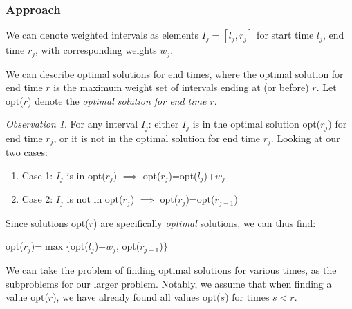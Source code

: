 \documentclass[12pt]{extarticle}
\theoremstyle{definition}
\theoremstyle{remark}
\newtheorem*{observation}{Observation}
\begin{document}
\subsubsection*{Approach}
We can denote weighted intervals as elements $I_j=[l_j,r_j]$ for start time $l_j$, end time $r_j$, with corresponding weights $w_j$.

\vspace{8pt}
\noindent We can describe optimal solutions for end times, where the optimal solution for end time $r$ is the maximum weight set of intervals ending at (or before) $r$. Let \ul{opt($r$)} denote the \textit{optimal solution for end time $r$}.

\begin{tcolorbox}[colback=white!95!black]
    \begin{observation}
    For any interval $I_j$: either $I_j$ is in the optimal solution opt($r_j$) for end time $r_j$, or it is not in the optimal solution for end time $r_j$. Looking at our two cases: \begin{enumerate}
        \item Case 1: $I_j$ is in opt($r_j$) $\implies$ opt($r_j$)=opt($l_j$)+$w_j$
        \item Case 2: $I_j$ is not in opt($r_j$) $\implies$ opt($r_j$)=opt($r_{j-1}$)
    \end{enumerate}
    Since solutions opt($r$) are specifically \textit{optimal} solutions, we can thus find:\begin{center}
        opt($r_j$)=$\max\{$opt($l_j$)+$w_j$, opt($r_{j-1}$)$\}$
    \end{center}
    \end{observation}
\end{tcolorbox}

We can take the problem of finding optimal solutions for various times, as the subproblems for our larger problem. Notably, we assume that when finding a value opt($r$), we have already found all values opt($s$) for times $s<r$.
\end{document}
